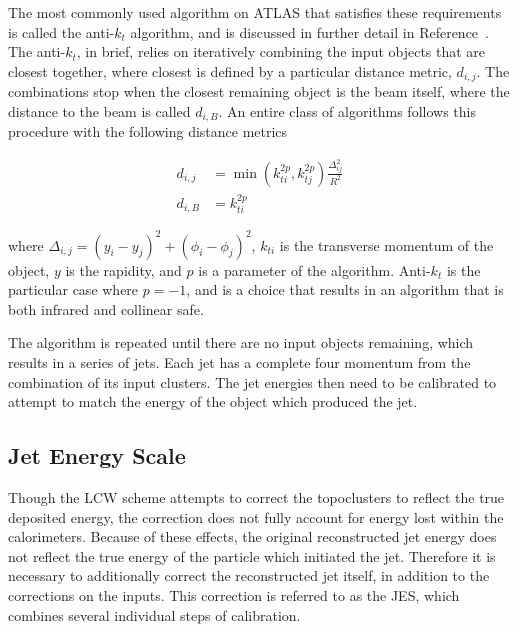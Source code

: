 The most commonly used algorithm on \ac{ATLAS} that satisfies these requirements is called the anti-$k_t$ algorithm, and is discussed in further detail in Reference~\cite{antikt}.
The anti-$k_t$, in brief, relies on iteratively combining the input objects that are closest together, where closest is defined by a particular distance metric, $d_{i,j}$.
The combinations stop when the closest remaining object is the beam itself, where the distance to the beam is called $d_{i,B}$. 
An entire class of algorithms follows this procedure with the following distance metrics

\begin{align}\label{eq:antikt}
d_{i,j} &= \min(k_{ti}^{2p}, k_{tj}^{2p}) \frac{\Delta_{ij}^2}{R^2} \\
d_{i,B} &= k_{ti}^{2p}
\end{align}

where $\Delta_{i,j} = (y_i - y_j)^2 + (\phi_i - \phi_j)^2$, $k_{ti}$ is the transverse momentum of the object, $y$ is the rapidity, and $p$ is a parameter of the algorithm.
Anti-$k_t$ is the particular case where $p = -1$, and is a choice that results in an algorithm that is both infrared and collinear safe.

The algorithm is repeated until there are no input objects remaining, which results in a series of jets. 
Each jet has a complete four momentum from the combination of its input clusters. 
The jet energies then need to be calibrated to attempt to match the energy of the object which produced the jet.

\subsection{Jet Energy Scale}

Though the \ac{LCW} scheme attempts to correct the topoclusters to reflect the true deposited energy, the correction does not fully account for energy lost within the calorimeters.
Because of these effects, the original reconstructed jet energy does not reflect the true energy of the particle which initiated the jet.
Therefore it is necessary to additionally correct the reconstructed jet itself, in addition to the corrections on the inputs.
This correction is referred to as the \ac{JES}, which combines several individual steps of calibration.

